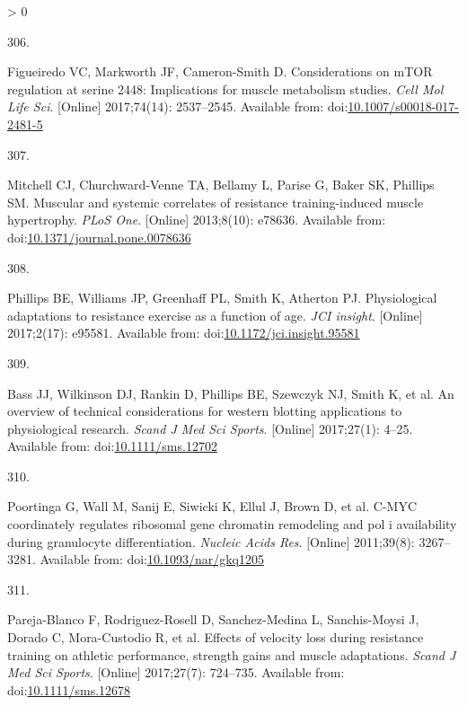 \documentclass[twoside,10pt]{gihclass} %
\newlength{\cslhangindent}
\newlength{\csllabelwidth}
\newenvironment{CSLReferences}[3] %
 {%
  \setlength{\parindent}{0pt}
  \ifodd #1 \everypar{\setlength{\hangindent}{\cslhangindent}}\ignorespaces\fi
  \ifnum #2 > 0
  \setlength{\parskip}{#2\baselineskip}
  \fi
 }%
 {}
\newcommand{\CSLLeftMargin}[1]{\parbox[t]{\maxof{\widthof{#1}}{\csllabelwidth}}{#1}}
\newcommand{\CSLRightInline}[1]{\parbox[t]{\linewidth}{#1}}
\begin{document}
\begin{CSLReferences}{0}{0}
\leavevmode\hypertarget{ref-RN2309}{}%
\CSLLeftMargin{306. }
\CSLRightInline{Figueiredo VC, Markworth JF, Cameron-Smith D. Considerations on mTOR regulation at serine 2448: Implications for muscle metabolism studies. \emph{Cell Mol Life Sci}. {[}Online{]} 2017;74(14): 2537--2545. Available from: doi:\href{https://doi.org/10.1007/s00018-017-2481-5}{10.1007/s00018-017-2481-5}}

\leavevmode\hypertarget{ref-RN788}{}%
\CSLLeftMargin{307. }
\CSLRightInline{Mitchell CJ, Churchward-Venne TA, Bellamy L, Parise G, Baker SK, Phillips SM. Muscular and systemic correlates of resistance training-induced muscle hypertrophy. \emph{PLoS One}. {[}Online{]} 2013;8(10): e78636. Available from: doi:\href{https://doi.org/10.1371/journal.pone.0078636}{10.1371/journal.pone.0078636}}

\leavevmode\hypertarget{ref-RN2171}{}%
\CSLLeftMargin{308. }
\CSLRightInline{Phillips BE, Williams JP, Greenhaff PL, Smith K, Atherton PJ. Physiological adaptations to resistance exercise as a function of age. \emph{JCI insight}. {[}Online{]} 2017;2(17): e95581. Available from: doi:\href{https://doi.org/10.1172/jci.insight.95581}{10.1172/jci.insight.95581}}

\leavevmode\hypertarget{ref-RN1942}{}%
\CSLLeftMargin{309. }
\CSLRightInline{Bass JJ, Wilkinson DJ, Rankin D, Phillips BE, Szewczyk NJ, Smith K, et al. An overview of technical considerations for western blotting applications to physiological research. \emph{Scand J Med Sci Sports}. {[}Online{]} 2017;27(1): 4--25. Available from: doi:\href{https://doi.org/10.1111/sms.12702}{10.1111/sms.12702}}

\leavevmode\hypertarget{ref-RN1832}{}%
\CSLLeftMargin{310. }
\CSLRightInline{Poortinga G, Wall M, Sanij E, Siwicki K, Ellul J, Brown D, et al. C-MYC coordinately regulates ribosomal gene chromatin remodeling and pol i availability during granulocyte differentiation. \emph{Nucleic Acids Res}. {[}Online{]} 2011;39(8): 3267--3281. Available from: doi:\href{https://doi.org/10.1093/nar/gkq1205}{10.1093/nar/gkq1205}}

\leavevmode\hypertarget{ref-RN2217}{}%
\CSLLeftMargin{311. }
\CSLRightInline{Pareja-Blanco F, Rodriguez-Rosell D, Sanchez-Medina L, Sanchis-Moysi J, Dorado C, Mora-Custodio R, et al. Effects of velocity loss during resistance training on athletic performance, strength gains and muscle adaptations. \emph{Scand J Med Sci Sports}. {[}Online{]} 2017;27(7): 724--735. Available from: doi:\href{https://doi.org/10.1111/sms.12678}{10.1111/sms.12678}}


\end{CSLReferences}
\end{document}
